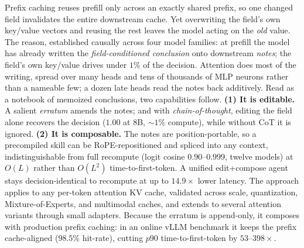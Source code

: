 Prefix caching reuses prefill only across an exactly shared prefix, so one changed
field invalidates the entire downstream cache.
Yet overwriting the field's own key/value vectors and reusing the rest leaves the model acting on
the \emph{old} value. The reason, established causally across four model families: at prefill the model
has already written the \emph{field-conditioned conclusion} onto downstream
\emph{notes}; the field's own key/value drives under $1\%$ of the decision. Attention does most
of the writing, spread over many heads and tens of thousands of MLP neurons rather than a nameable few; a
dozen late heads read the notes back additively. Read as a notebook of memoized conclusions, two capabilities
follow.
\textbf{(1) It is editable.} A salient \emph{erratum} amends the notes;
and with \emph{chain-of-thought}, editing the field alone recovers the decision ($1.00$ at
$8$B, ${\sim}1\%$ compute), while without CoT it is ignored.
\textbf{(2) It is composable.} The notes are position-portable, so a precompiled skill can be RoPE-repositioned
and spliced into any context, indistinguishable from full recompute (logit cosine $0.90$--$0.999$, twelve
models) at $O(L)$ rather than $O(L^2)$ time-to-first-token. A unified edit+compose agent stays
decision-identical to recompute at up to $14.9\times$ lower latency.
The approach applies to any per-token attention KV cache, validated across scale, quantization,
Mixture-of-Experts, and multimodal caches, and extends to several attention variants through small
adapters. Because the erratum is append-only, it composes with production prefix caching: in an online
vLLM benchmark it keeps the prefix cache-aligned ($98.5\%$ hit-rate), cutting $p90$ time-to-first-token by
$53$--$398\times$.
